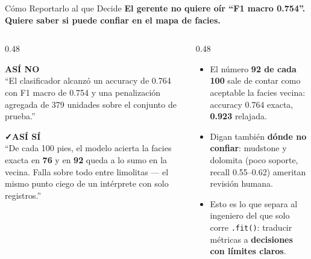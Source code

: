 \documentclass[aspectratio=169, 11pt]{beamer}
\begin{document}
\begin{frame}[shrink=16]{Cómo Reportarlo al que Decide}
  \vspace{-4pt}
  {\small\color{arcaDark}\bfseries
    El gerente no quiere oír ``F1 macro 0.754''. Quiere saber si puede confiar en el mapa de facies.}

  \vspace{8pt}
  \begin{columns}[T]
    \begin{column}{0.48\textwidth}
      \begin{tcolorbox}[colback=arcaGray, colframe=arcaRed, boxrule=0pt, leftrule=3pt,
        arc=3pt, left=6pt, right=6pt, top=5pt, bottom=5pt]
        {\scriptsize\color{arcaRed}\bfseries\faTimes\hspace{4pt}ASÍ NO}\\[4pt]
        {\scriptsize\color{textMuted}
          ``El clasificador alcanzó un accuracy de 0.764 con
          F1 macro de 0.754 y una penalización agregada de 379
          unidades sobre el conjunto de prueba.''}
      \end{tcolorbox}
      \vspace{6pt}
      \begin{tcolorbox}[colback=arcaGray, colframe=codeGreen, boxrule=0pt, leftrule=3pt,
        arc=3pt, left=6pt, right=6pt, top=5pt, bottom=5pt]
        {\scriptsize\color{codeGreen}\bfseries\faCheck\hspace{4pt}ASÍ SÍ}\\[4pt]
        {\scriptsize\color{textMuted}
          ``De cada 100 pies, el modelo acierta la facies exacta
          en \textbf{76} y en \textbf{92} queda a lo sumo en la
          vecina. Falla sobre todo entre limolitas --- el mismo
          punto ciego de un intérprete con solo registros.''}
      \end{tcolorbox}
    \end{column}
    \begin{column}{0.48\textwidth}
      {\footnotesize\color{textMuted}
      \begin{itemize}\setlength{\itemsep}{5pt}
        \item[{\color{arcaRed}\scriptsize\faArrowRight}]
          El número \textbf{92 de cada 100} sale de contar como
          aceptable la facies vecina: accuracy 0.764 exacta,
          \textbf{0.923} relajada.
        \item[{\color{arcaRed}\scriptsize\faArrowRight}]
          Digan también \textbf{dónde no confiar}: mudstone y
          dolomita (poco soporte, recall 0.55--0.62)
          ameritan revisión humana.
        \item[{\color{codeGreen}\scriptsize\faCheck}]
          Esto es lo que separa al ingeniero del que solo corre
          \texttt{.fit()}: traducir métricas a \textbf{decisiones
          con límites claros}.
      \end{itemize}
      }
    \end{column}
  \end{columns}
\end{frame}
\end{document}
